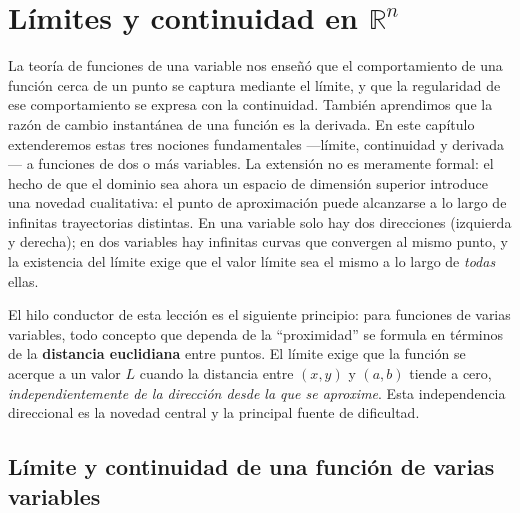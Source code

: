 
\chapter{Límites y continuidad en $\mathbb{R}^n$}

La teoría de funciones de una variable nos enseñó que el comportamiento
de una función cerca de un punto se captura mediante el límite, y que
la regularidad de ese comportamiento se expresa con la continuidad.
También aprendimos que la razón de cambio instantánea de una función
es la derivada. En este capítulo extenderemos estas tres nociones
fundamentales —límite, continuidad y derivada— a funciones de dos o
más variables. La extensión no es meramente formal: el hecho de que
el dominio sea ahora un espacio de dimensión superior introduce una
novedad cualitativa: el punto de aproximación puede alcanzarse a lo
largo de infinitas trayectorias distintas. En una variable solo hay
dos direcciones (izquierda y derecha); en dos variables hay infinitas
curvas que convergen al mismo punto, y la existencia del límite exige
que el valor límite sea el mismo a lo largo de \emph{todas} ellas.

\begin{rem}
El hilo conductor de esta lección es el siguiente principio: para
funciones de varias variables, todo concepto que dependa de la
``proximidad'' se formula en términos de la \textbf{distancia
euclidiana} entre puntos. El límite exige que la función se acerque a
un valor $L$ cuando la distancia entre $(x,y)$ y $(a,b)$ tiende a cero,
\emph{independientemente de la dirección desde la que se aproxime}.
Esta independencia direccional es la novedad central y la principal
fuente de dificultad.
\end{rem}


\section{Límite y continuidad de una función de varias variables}

